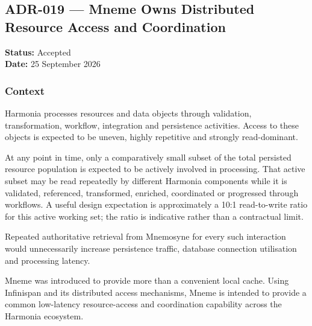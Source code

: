 
\subsection{ADR-019 --- Mneme Owns Distributed Resource Access and Coordination}
\label{adr:019-mneme-distributed-resource-access-coordination}

\textbf{Status:} Accepted\\
\textbf{Date:} 25 September 2026

\subsubsection{Context}

Harmonia processes resources and data objects through validation, transformation, workflow, integration and persistence activities. Access to these objects is expected to be uneven, highly repetitive and strongly read-dominant.

At any point in time, only a comparatively small subset of the total persisted resource population is expected to be actively involved in processing. That active subset may be read repeatedly by different Harmonia components while it is validated, referenced, transformed, enriched, coordinated or progressed through workflows. A useful design expectation is approximately a 10:1 read-to-write ratio for this active working set; the ratio is indicative rather than a contractual limit.

Repeated authoritative retrieval from Mnemosyne for every such interaction would unnecessarily increase persistence traffic, database connection utilisation and processing latency.

Mneme was introduced to provide more than a convenient local cache. Using Infinispan and its distributed access mechanisms, Mneme is intended to provide a common low-latency resource-access and coordination capability across the Harmonia ecosystem.

